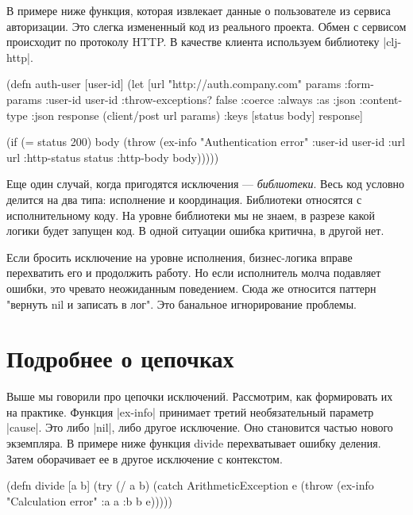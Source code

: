 В примере ниже функция, которая извлекает данные о пользователе из сервиса
авторизации. Это слегка измененный код из реального проекта. Обмен с сервисом
происходит по протоколу HTTP. В качестве клиента используем библиотеку
\spverb|clj-http|.

\begin{code}
(defn auth-user
  [user-id]
  (let [url "http://auth.company.com"
        params {:form-params {:user-id user-id}
                :throw-exceptions? false
                :coerce :always
                :as :json
                :content-type :json}
        response (client/post url params)
        {:keys [status body]} response]

    (if (= status 200)
      body
      (throw (ex-info "Authentication error"
                      {:user-id user-id
                       :url url
                       :http-status status
                       :http-body body})))))
\end{code}

Еще один случай, когда пригодятся исключения — \emph{библиотеки}. Весь код условно
делится на два типа: исполнение и координация. Библиотеки относятся с
исполнительному коду. На уровне библиотеки мы не знаем, в разрезе какой логики
будет запущен код. В одной ситуации ошибка критична, в другой нет.

Если бросить исключение на уровне исполнения, бизнес-логика вправе перехватить
его и продолжить работу. Но если исполнитель молча подавляет ошибки, это чревато
неожиданным поведением. Сюда же относится паттерн "вернуть nil и записать в
лог". Это банальное игнорирование проблемы.

\section{Подробнее о цепочках}

Выше мы говорили про цепочки исключений. Рассмотрим, как формировать их на
практике. Функция \spverb|ex-info| принимает третий необязательный параметр
\spverb|cause|. Это либо \spverb|nil|, либо другое исключение. Оно становится частью нового
экземпляра. В примере ниже функция divide перехватывает ошибку деления. Затем
оборачивает ее в другое исключение с контекстом.

\begin{code}
(defn divide [a b]
  (try
    (/ a b)
    (catch ArithmeticException e
      (throw (ex-info
              "Calculation error"
              {:a a :b b}
              e)))))
\end{code}

